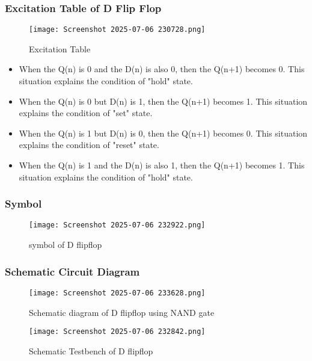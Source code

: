 \documentclass[12pt]{article}
\begin{document}
    \subsubsection{Excitation Table of D Flip Flop}
    \begin{figure}[H]
        \centering
        \texttt{[image: Screenshot 2025-07-06 230728.png]}
        \caption{Excitation Table}
        \label{fig:enter-label}
    \end{figure}

    \begin{itemize}
        \item When the Q(n) is 0 and the D(n) is also 0, then the Q(n+1) becomes 0. This situation explains the condition of "hold" state.
        \item When the Q(n) is 0 but D(n) is 1, then the Q(n+1) becomes 1. This situation explains the condition of "set" state.
        \item When the Q(n) is 1 but D(n) is 0, then the Q(n+1) becomes 0. This situation explains the condition of "reset" state.
        \item When the Q(n) is 1 and the D(n) is also 1, then the Q(n+1) becomes 1. This situation explains the condition of "hold" state.
    \end{itemize}

    \subsubsection{Symbol}
        \begin{figure}[H]
            \centering
            \texttt{[image: Screenshot 2025-07-06 232922.png]}
            \caption{symbol of D flipflop}
            \label{fig:enter-label}
        \end{figure}
    \subsubsection{Schematic Circuit Diagram}

        \begin{figure}[H]
            \centering
            \texttt{[image: Screenshot 2025-07-06 233628.png]}
            \caption{Schematic diagram of D flipflop using NAND gate}
            \label{fig:enter-label}
        \end{figure}

        \begin{figure}
            \centering
            \texttt{[image: Screenshot 2025-07-06 232842.png]}
            \caption{Schematic Testbench of D flipflop}
            \label{fig:enter-label}
        \end{figure}
       
\end{document}
